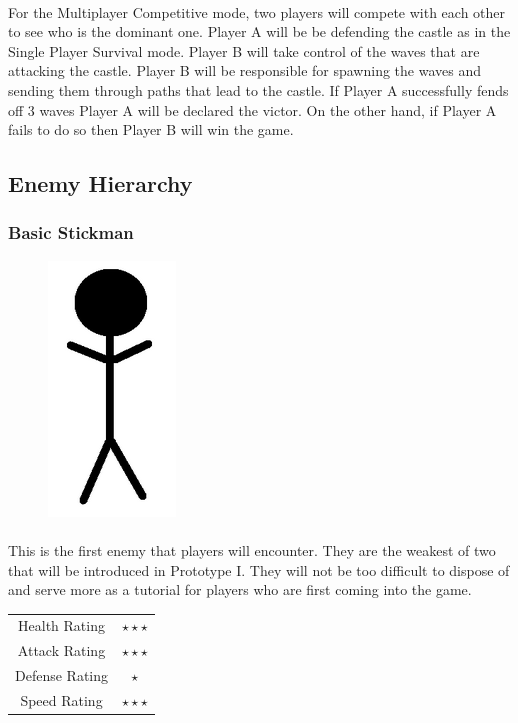\paragraph{} For the Multiplayer Competitive mode, two players will compete with each other to see who is the dominant one. Player A will be be defending the castle as in the Single Player Survival mode. Player B will take control of the waves that are attacking the castle. Player B will be responsible for spawning the waves and sending them through paths that lead to the castle. If Player A successfully fends off 3 waves Player A will be declared the victor. On the other hand, if Player A fails to do so then Player B will win the game.

\subsection{Enemy Hierarchy}

\subsubsection{Basic Stickman}

\begin{figure}[H]
	\centering
	\includegraphics{../images/castle-defense-basic-stickman.png}
\end{figure}

\paragraph{} This is the first enemy that players will encounter. They are the weakest of two that will be introduced in Prototype I. They will not be too difficult to dispose of and serve more as a tutorial for players who are first coming into the game.

\begin{table}[H]
	\centering
	\begin{tabular}{c >{\(}c<{\)}}
		Health Rating	&	\star \star \star\\
		Attack Rating	&	\star \star \star\\
		Defense Rating	&	\star\\
		Speed Rating	&	\star \star \star
	\end{tabular}
\end{table}

